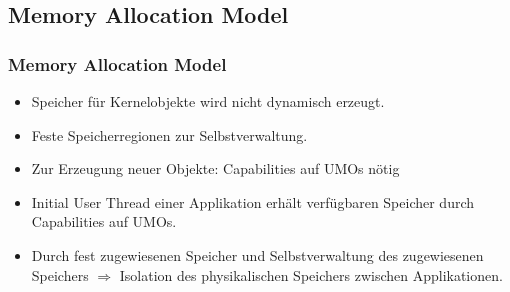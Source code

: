 \documentclass{beamer}
\begin{document}
\subsection{Memory Allocation Model}
\begin{frame}
\frametitle{Memory Allocation Model}
\begin{itemize}
\item Speicher für Kernelobjekte wird nicht dynamisch erzeugt.
\item Feste Speicherregionen zur Selbstverwaltung.
\item Zur Erzeugung neuer Objekte: Capabilities auf UMOs nötig
\item Initial User Thread einer Applikation erhält verfügbaren Speicher durch Capabilities auf UMOs.
\item Durch fest zugewiesenen Speicher und Selbstverwaltung des zugewiesenen Speichers $\Rightarrow$ Isolation des physikalischen Speichers zwischen Applikationen.
\end{itemize}
\end{frame}
\end{document}
